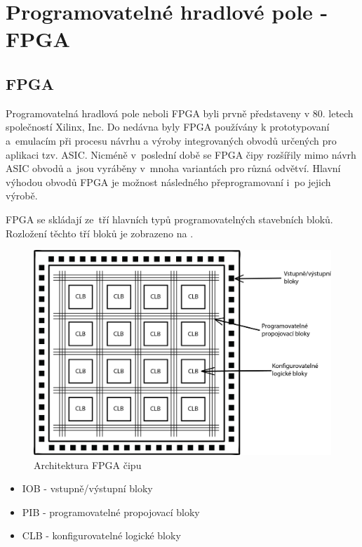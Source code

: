 %
%
%
\chapter{Programovatelné hradlové pole - FPGA}
\section{FPGA}
Programovatelná hradlová pole neboli FPGA byli prvně představeny v 80. letech společností Xilinx, Inc. Do nedávna byly FPGA používány k prototypovaní a~emulacím při procesu návrhu a výroby integrovaných obvodů určených pro aplikaci tzv. ASIC.\cite{Sekanina3540403779ISBN}
Nicméně v~poslední době se FPGA čipy rozšířily mimo návrh ASIC obvodů a~jsou vyráběny v~mnoha variantách pro různá odvětví. Hlavní výhodou obvodů FPGA je možnost následného přeprogramovaní i~po jejich výrobě.\cite{FPGAfromMIT}

FPGA se skládají ze~tří hlavních typů programovatelných stavebních bloků. Rozložení těchto tří bloků je zobrazeno na .
\begin{figure}[!h]
  \begin{center}
    \includegraphics[scale=0.5]{obrazky/FPGA-architekrura-vlastni.png}
  \end{center}
  \caption[Architektura FPGA]{Architektura FPGA čipu \cite{electronicshub.org}}
  \label{img:Architektura}
\end{figure}
\begin{itemize}
    \item IOB - vstupně/výstupní bloky
    \item PIB - programovatelné propojovací bloky
    \item CLB - konfigurovatelné logické bloky
\end{itemize}

